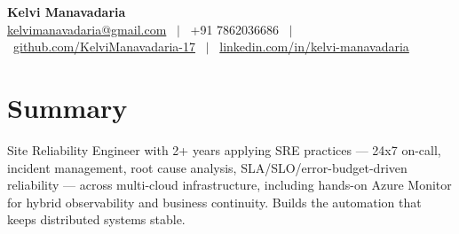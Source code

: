 \documentclass[a4paper,10.999999pt]{article}
\begin{document}
    \pagestyle{empty}



    \begin{center}
    \LARGE{\textbf{Kelvi Manavadaria}} \\[1.5pt]
    {\small
    \href{mailto:kelvimanavadaria@gmail.com}{kelvimanavadaria@gmail.com} \ $|$ \
    +91 7862036686 \ $|$ \
    \href{https://github.com/KelviManavadaria-17}{github.com/KelviManavadaria-17} \ $|$ \
    \href{https://www.linkedin.com/in/kelvi-manavadaria/}{linkedin.com/in/kelvi-manavadaria}
    }
    \end{center}

    \vspace{0.5pt}


    \section{Summary}
Site Reliability Engineer with 2+ years applying SRE practices — 24x7 on-call, incident management, root cause analysis, SLA/SLO/error-budget-driven reliability — across multi-cloud infrastructure, including hands-on Azure Monitor for hybrid observability and business continuity. Builds the automation that keeps distributed systems stable.

\end{document}
